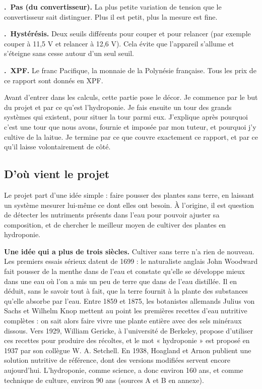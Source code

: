 \documentclass[11pt,a4paper]{article}
\newcounter{lex}
\newcommand{\terme}[2]{\par\medskip\noindent\stepcounter{lex}\textbf{\thelex.\ #1.} #2\par}
\newcounter{annexe}\newcounter{schema}
\begin{document}
\terme{Pas (du convertisseur)}{La plus petite variation de tension que le convertisseur sait distinguer. Plus il est petit, plus la mesure est fine.}

\terme{Hystérésis}{Deux seuils différents pour couper et pour relancer (par exemple couper à 11,5 V et relancer à 12,6 V). Cela évite que l'appareil s'allume et s'éteigne sans cesse autour d'un seul seuil.}

\terme{XPF}{Le franc Pacifique, la monnaie de la Polynésie française. Tous les prix de ce rapport sont donnés en XPF.}




Avant d'entrer dans les calculs, cette partie pose le décor. Je commence par le but du projet et par ce qu'est l'hydroponie. Je fais ensuite un tour des grands systèmes qui existent, pour situer la tour parmi eux. J'explique après pourquoi c'est une tour que nous avons, fournie et imposée par mon tuteur, et pourquoi j'y cultive de la laitue. Je termine par ce que couvre exactement ce rapport, et par ce qu'il laisse volontairement de côté.

\subsection{D'où vient le projet}

Le projet part d'une idée simple : faire pousser des plantes sans terre, en laissant un système mesurer lui-même ce dont elles ont besoin. À l'origine, il est question de détecter les nutriments présents dans l'eau pour pouvoir ajuster sa composition, et de chercher le meilleur moyen de cultiver des plantes en hydroponie.

\textbf{Une idée qui a plus de trois siècles.} Cultiver sans terre n'a rien de nouveau. Les premiers essais sérieux datent de 1699 : le naturaliste anglais John Woodward fait pousser de la menthe dans de l'eau et constate qu'elle se développe mieux dans une eau où l'on a mis un peu de terre que dans de l'eau distillée. Il en déduit, sans le savoir tout à fait, que la terre fournit à la plante des substances qu'elle absorbe par l'eau. Entre 1859 et 1875, les botanistes allemands Julius von Sachs et Wilhelm Knop mettent au point les premières recettes d'eau nutritive complètes : on sait alors faire vivre une plante entière avec des sels minéraux dissous. Vers 1929, William Gericke, à l'université de Berkeley, propose d'utiliser ces recettes pour produire des récoltes, et le mot « hydroponie » est proposé en 1937 par son collègue W. A. Setchell. En 1938, Hoagland et Arnon publient une solution nutritive de référence, dont des versions modifiées servent encore aujourd'hui. L'hydroponie, comme science, a donc environ 160 ans, et comme technique de culture, environ 90 ans (sources A et B en annexe).
\end{document}
